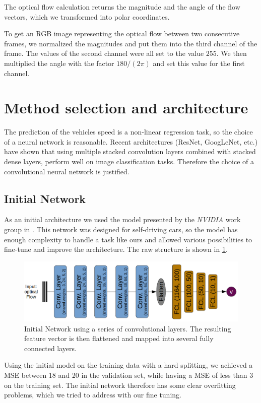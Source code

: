 \documentclass[conference]{IEEEtran}
\begin{document}
The optical flow calculation returns the magnitude and
the angle of the flow vectors, which we transformed into polar 
coordinates.

To get an RGB image representing the
optical flow between two consecutive frames, we normalized the magnitudes and put them into the third channel 
of the frame. The values
of the second channel were all set to the value $255$. We then multiplied the angle with the factor 
$180/(2\pi)$ and set this value 
for the first channel.

\section{Method selection and architecture}
The prediction of the vehicles speed is a non-linear regression task, so the choice of a neural network 
is reasonable. Recent architectures (ResNet, GoogLeNet, etc.) have shown that using multiple stacked 
convolution layers combined with stacked dense layers, perform well on image classification tasks. 
Therefore the choice of a convolutional neural network is justified.

\subsection{Initial Network}
As an initial architecture we used the model presented by the \emph{NVIDIA} work group in 
\cite{NVIDIA2016}. This network was designed for self-driving cars, so the model has enough complexity 
to handle a task like ours and allowed various possibilities to fine-tune and improve the architecture. 
The raw structure is shown in \cref{fig:initialNetwork}.
\begin{figure}[ht]
	\centering
	\includegraphics[width=0.9\columnwidth]{imgs/InitialNetwork.png}
	\caption{Initial Network using a series of convolutional layers. The resulting feature vector is 
	then flattened and mapped into several fully connected layers.}
	\label{fig:initialNetwork}
\end{figure}

Using the initial model on the training data with a hard splitting, we achieved a MSE between 18 and 20 
in the validation set, while having a MSE of less than 3 on the training set. The initial network 
therefore has some clear overfitting problems, which we tried to address with our fine tuning.
\end{document}
